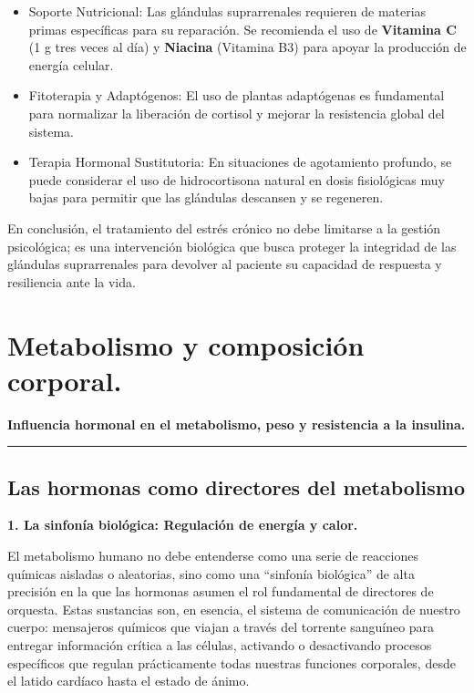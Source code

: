 \documentclass[
  spanish,
]{article}
\begin{document}
\begin{itemize}
\item
  Soporte Nutricional: Las glándulas suprarrenales requieren de materias primas específicas para su reparación. Se recomienda el uso de \textbf{Vitamina C} (1 g tres veces al día) y \textbf{Niacina} (Vitamina B3) para apoyar la producción de energía celular.
\item
  Fitoterapia y Adaptógenos: El uso de plantas adaptógenas es fundamental para normalizar la liberación de cortisol y mejorar la resistencia global del sistema.
\item
  Terapia Hormonal Sustitutoria: En situaciones de agotamiento profundo, se puede considerar el uso de hidrocortisona natural en dosis fisiológicas muy bajas para permitir que las glándulas descansen y se regeneren.
\end{itemize}

En conclusión, el tratamiento del estrés crónico no debe limitarse a la gestión psicológica; es una intervención biológica que busca proteger la integridad de las glándulas suprarrenales para devolver al paciente su capacidad de respuesta y resiliencia ante la vida.

\section{Metabolismo y composición corporal.}\label{metabolismo-y-composiciuxf3n-corporal.}

\textbf{Influencia hormonal en el metabolismo, peso y resistencia a la insulina.}

\begin{center}\rule{0.5\linewidth}{0.5pt}\end{center}

\subsection{Las hormonas como directores del metabolismo}\label{las-hormonas-como-directores-del-metabolismo}

\textbf{1. La sinfonía biológica: Regulación de energía y calor.}

El metabolismo humano no debe entenderse como una serie de reacciones químicas aisladas o aleatorias, sino como una ``sinfonía biológica'' de alta precisión en la que las hormonas asumen el rol fundamental de directores de orquesta. Estas sustancias son, en esencia, el sistema de comunicación de nuestro cuerpo: mensajeros químicos que viajan a través del torrente sanguíneo para entregar información crítica a las células, activando o desactivando procesos específicos que regulan prácticamente todas nuestras funciones corporales, desde el latido cardíaco hasta el estado de ánimo.
\end{document}
